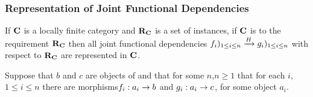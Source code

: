  
\subsubsection{Representation of Joint Functional Dependencies}
\begin{lemma}
If $\catc$ is a locally finite category and $\reqtc$ is a set of instances, if $\catc$ is 
 to the requirement $\reqtc$ then
all joint functional dependencies $\fundep{H}{f_i)_{1 \le i \leq n}}{g_i)_{1 \le i \leq n}}$  with respect to $\reqtc$ are represented in $\catc$.

Suppose that $b$ and $c$ are objects of \catcw and that for some $n$,$n \geq 1$ that for each $i$,$1\leq i \leq n$ there are morphisms$f_i: a_i \morph b$ and 
$g_i: a_i \morph c$, for some object $a_i$.

\end{lemma}

